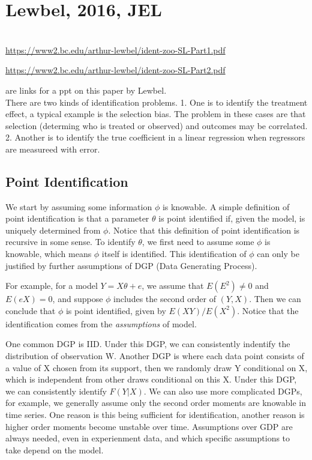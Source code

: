 \documentclass{book}
\theoremstyle{plain}
\theoremstyle{definition}
\begin{document}


\section{Lewbel, 2016, JEL} %
\label{sec:lewbel_2016_jel}

\textbf{}\\

\url{https://www2.bc.edu/arthur-lewbel/ident-zoo-SL-Part1.pdf} 

\url{https://www2.bc.edu/arthur-lewbel/ident-zoo-SL-Part2.pdf}

are links for a ppt on this paper by Lewbel.\\

There are two kinds of identification problems. 
1. One is to identify the treatment effect, a typical example is the selection bias. The problem in these cases are that selection (determing who is treated or observed) and outcomes may be correlated. 
2. Another is to identify the true coefficient in a linear regression when regressors are measureed with error.

\subsection{Point Identification} %
\label{sub:point_identification}

We start by assuming some information $\phi$ is knowable. A simple definition of point identification is that a parameter $\theta$ is point identified if, given the model, is uniquely determined from $\phi$. Notice that this definition of point identification is recursive in some sense. To identify $\theta$, we first need to assume some $\phi$ is knowable, which means $\phi$ itself is identified. This identification of $\phi$ can only be justified by further assumptions of DGP (Data Generating Process).

For example, for a model $Y = X\theta +e$, we assume that $E(E^2)\ne0$ and $E(eX)=0$, and suppose $\phi$ includes the second order of $(Y,X)$. Then we can conclude that $\phi$ is point identified, given by $E(XY)/E(X^2)$. Notice that the identification comes from the \textit{assumptions} of model.

One common DGP is IID. Under this DGP, we can consistently indentify the distribution of observation W. Another DGP is where each data point consists of a value of X chosen from its support, then we randomly draw Y conditional on X, which is independent from other draws conditional on this X. Under this DGP, we can consistently identify $F(Y|X)$. We can also use more complicated DGPs, for example, we generally assume only the second order moments are knowable in time series. One reason is this being sufficient for identification, another reason is higher order moments become unstable over time. Assumptions over GDP are always needed, even in experienment data, and which specific assumptions to take depend on the model.
\end{document}
